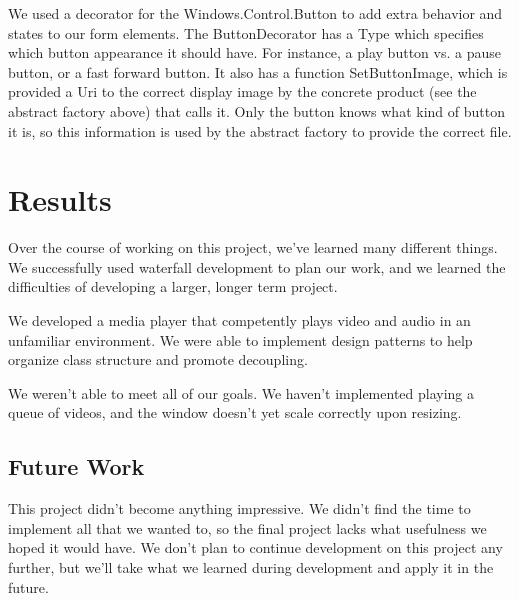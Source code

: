 \documentclass[10pt,conference,onecolumn,compsoc]{IEEEtran}
\begin{document}
We used a decorator for the Windows.Control.Button to add extra behavior and states to our form elements. The ButtonDecorator has a Type which specifies which button appearance it should have. For instance, a play button vs. a pause button, or a fast forward button. It also has a function SetButtonImage, which is provided a Uri to the correct display image by the concrete product (see the abstract factory above) that calls it. Only the button knows what kind of button it is, so this information is used by the abstract factory to provide the correct file.


\section{Results}
Over the course of working on this project, we've learned many different things. We successfully used waterfall development to plan our work, and we learned the difficulties of developing a larger, longer term project. \medskip

We developed a media player that competently plays video and audio in an unfamiliar environment. We were able to implement design patterns to help organize class structure and promote decoupling. \medskip

We weren't able to meet all of our goals. We haven't implemented playing a queue of videos, and the window doesn't yet scale correctly upon resizing. 

\subsection{Future Work}
This project didn't become anything impressive. We didn't find the time to implement all that we wanted to, so the final project lacks what usefulness we hoped it would have. We don't plan to continue development on this project any further, but we'll take what we learned during development and apply it in the future. 









\end{document}
